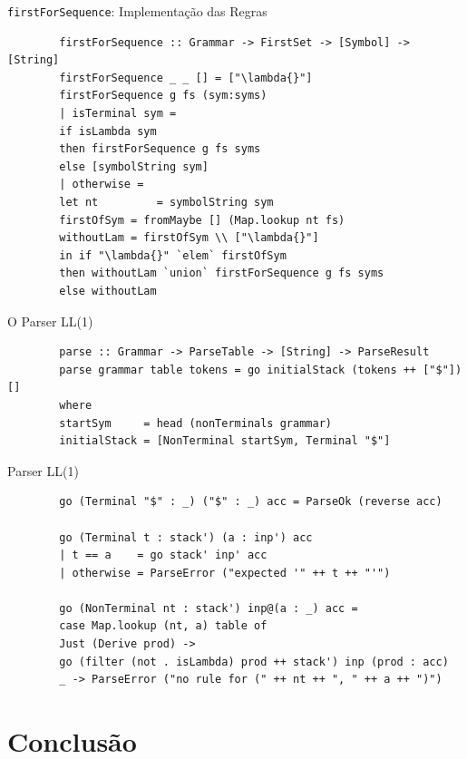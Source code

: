 \begin{frame}[fragile]{\texttt{firstForSequence}:
    Implementação das Regras}

    \begin{lstlisting}
        firstForSequence :: Grammar -> FirstSet -> [Symbol] -> [String]
        firstForSequence _ _ [] = ["\lambda{}"]
        firstForSequence g fs (sym:syms)
        | isTerminal sym =
        if isLambda sym
        then firstForSequence g fs syms
        else [symbolString sym]
        | otherwise =
        let nt         = symbolString sym
        firstOfSym = fromMaybe [] (Map.lookup nt fs)
        withoutLam = firstOfSym \\ ["\lambda{}"]
        in if "\lambda{}" `elem` firstOfSym
        then withoutLam `union` firstForSequence g fs syms
        else withoutLam
    \end{lstlisting}
\end{frame}

\begin{frame}[fragile]{O Parser LL(1)}

    \begin{lstlisting}
        parse :: Grammar -> ParseTable -> [String] -> ParseResult
        parse grammar table tokens = go initialStack (tokens ++ ["$"]) []
        where
        startSym     = head (nonTerminals grammar)
        initialStack = [NonTerminal startSym, Terminal "$"]
    \end{lstlisting}
\end{frame}

\begin{frame}[fragile]{Parser LL(1)}

    \begin{lstlisting}
        go (Terminal "$" : _) ("$" : _) acc = ParseOk (reverse acc)

        go (Terminal t : stack') (a : inp') acc
        | t == a    = go stack' inp' acc
        | otherwise = ParseError ("expected '" ++ t ++ "'")

        go (NonTerminal nt : stack') inp@(a : _) acc =
        case Map.lookup (nt, a) table of
        Just (Derive prod) ->
        go (filter (not . isLambda) prod ++ stack') inp (prod : acc)
        _ -> ParseError ("no rule for (" ++ nt ++ ", " ++ a ++ ")")
    \end{lstlisting}
\end{frame}


\section{Conclusão}\label{conclusuxe3o}

